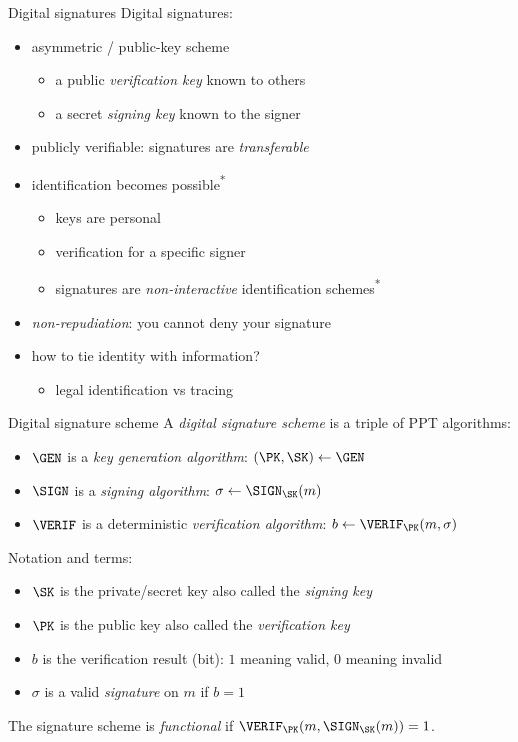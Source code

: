 \begin{frame}{Digital signatures}
  Digital signatures:
  \begin{itemize}[<+(1)->]
    \item asymmetric / public-key scheme
    \begin{itemize}
      \item a public \emph{verification key} known to others
      \item a secret \emph{signing key} known to the signer
    \end{itemize}
    \item publicly verifiable: signatures are \emph{transferable}
    \item identification becomes possible\textsuperscript{*}
    \begin{itemize}
      \item keys are personal
      \item verification for a specific signer
      \item signatures are \emph{non-interactive} identification schemes\textsuperscript{*}
    \end{itemize}
    \item \emph{non-repudiation}: you cannot deny your signature
    \item how to tie identity with information?
    \begin{itemize}
      \item legal identification vs tracing
    \end{itemize}
  \end{itemize}
\end{frame}

\begin{frame}{Digital signature scheme}
  A \emph{digital signature scheme} is a triple of PPT algorithms:
  \begin{itemize}[<+(1)->]
    \item $\GEN$ is a \emph{key generation algorithm}: $(\PK, \SK)\gets\GEN$
    \item $\SIGN$ is a \emph{signing algorithm}: $\sigma\gets\SIGN_\SK(m)$
    \item $\VERIF$ is a deterministic \emph{verification algorithm}: $b\gets\VERIF_\PK(m, \sigma)$
  \end{itemize}

  \pause
  Notation and terms:
  \begin{itemize}[<+(1)->]
    \item $\SK$ is the private/secret key also called the \emph{signing key}
    \item $\PK$ is the public key also called the \emph{verification key}
    \item $b$ is the verification result (bit): $1$ meaning valid, $0$ meaning invalid
    \item $\sigma$ is a valid \emph{signature} on $m$ if $b = 1$
  \end{itemize}

  \pause
  The signature scheme is \emph{functional} if $\VERIF_\PK(m, \SIGN_\SK(m)) = 1$.
\end{frame}

